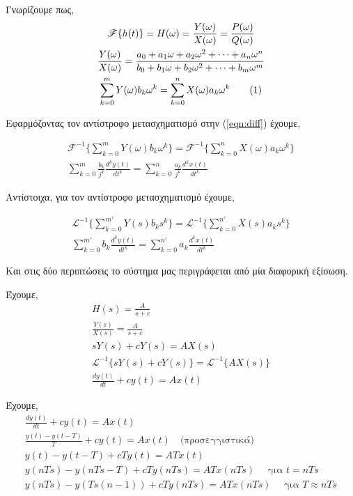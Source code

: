 \documentclass{assignment}
\begin{document}
\begin{answers}

\answer
Γνωρίζουμε πως,
\begin{gather*}
\mathscr{F}\{h(t)\} = H(\omega) = \frac{Y(\omega)}{X(\omega)} = \frac{P(\omega)}{Q(\omega)} \\
\frac{Y(\omega)}{X(\omega)} =  \frac{a_0 + a_1\omega + a_2\omega^2 + \dots + a_n\omega^n}{
                                     b_0 + b_1\omega + b_2\omega^2 + \dots + b_m\omega^m} \\
\sum_{k=0}^{m} Y(\omega)b_k\omega^k = \sum_{k=0}^{n}X(\omega)a_k\omega^k \stepcounter{equation} \tag{\theequation} \label{eqn:diff}
\end{gather*}

Εφαρμόζοντας τον αντίστροφο μετασχηματισμό  στην (\ref{eqn:diff}) έχουμε,

\begin{gather*}
\mathscr{F}^{-1}\big\{\sum_{k=0}^{m} Y(\omega)b_k\omega^k \bigg\} = \mathscr{F}^{-1}\bigg\{\sum_{k=0}^{n}X(\omega)a_k\omega^k \bigg\} \\
\sum_{k=0}^{m}\frac{b_k}{j^k}\frac{d^ky(t)}{dt^k} = \sum_{k=0}^{n}\frac{a_k}{j^k}\frac{d^kx(t)}{dt^k} 
\end{gather*}

Αντίστοιχα, για τον αντίστροφο μετασχηματισμό  έχουμε,

\begin{gather*}
\mathscr{L}^{-1}\big\{\sum_{k=0}^{m'} Y(s)b_ks^k \bigg\} = \mathscr{L}^{-1}\bigg\{\sum_{k=0}^{n'}X(s)a_ks^k \bigg\} \\
\sum_{k=0}^{m'}b_k\frac{d^{k}y(t)}{dt^{k}} = \sum_{k=0}^{n'}a_k\frac{d^{k}x(t)}{dt^k} 
\end{gather*}

Και στις δύο περιπτώσεις το σύστημα μας περιγράφεται από μία διαφορική εξίσωση.


\answer
Έχουμε,
\begin{gather*}
H(s) = \frac{A}{s+c} \\
\frac{Y(s)}{X(s)} = \frac{A}{s+c} \\
sY(s) + cY(s) = AX(s) \\
\mathscr{L}^{-1}\bigg\{sY(s) + cY(s)\bigg\} = \mathscr{L}^{-1}\bigg\{AX(s)\bigg\}\\
\frac{dy(t)}{dt} + cy(t) = Ax(t)
\end{gather*}

\answer
Έχουμε,
\begin{gather*}
\frac{dy(t)}{dt} + cy(t) = Ax(t) \\
\frac{y(t) - y(t-T)}{T} + cy(t) = Ax(t) \quad \text{(προσεγγιστικά)}\\
y(t) - y(t-T) + cTy(t) = ATx(t) \\
y(nTs) - y(nTs - T) + cTy(nTs) = ATx(nTs) \quad \text{ για } t = nTs\\
y(nTs) - y(Ts(n-1)) + cTy(nTs) = ATx(nTs) \quad \text{ για } T \approx nTs
\end{gather*}


\end{answers}
\end{document}
